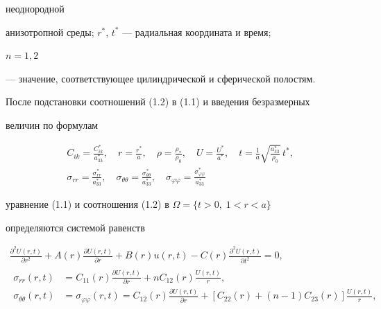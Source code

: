 неоднородной 


анизотропной среды; $r^*$, $t^*$ --- радиальная координата и время; 


$n=1,2$ 


--- значение, соответствующее цилиндрической и сферической полостям. 


 


После подстановки соотношений (1.2) в (1.1) и введения безразмерных 


величин по формулам 


\begin{gather*} 


C_{ik}=\frac{C^*_{ik}}{a^*_{33}},\quad r=\frac{r^*}{a},\quad 


\rho=\frac{\rho_*}{\rho_0},\quad U=\frac{U^*}{a^*},\quad 


t=\frac{1}{a}\sqrt{\frac{a^*_{33}}{\rho_0}}\,t^*, \\ 


\sigma_{rr}=\frac{\sigma^*_{rr}}{a^*_{33}},\quad 


\sigma_{\theta\theta}=\frac{\sigma^*_{\theta\theta}}{a^*_{33}},\quad 


\sigma_{\varphi\varphi}=\frac{\sigma^*_{\varphi\varphi}}{a^*_{33}} 


\end{gather*} 


уравнение (1.1) и соотношения (1.2) в $\Omega=\{t>0,\;1<r<a\}$ 


определяются системой равенств 


\begin{gather} 


\frac{\partial^2U(r,t)}{\partial r^2}+A(r) 


\frac{\partial U(r,t)}{\partial r}+B(r)u(r,t)-C(r) 


\frac{\partial^2U(r,t)}{\partial t^2}=0, \\ 


\begin{split} 


\sigma_{rr}(r,t)&=C_{11}(r)\frac{\partial U(r,t)}{\partial r}+ 


n C_{12}(r)\frac{U(r,t)}{r}, \\ 


\sigma_{\theta\theta}(r,t)&=\sigma_{\varphi\varphi}(r,t)= 


C_{12}(r)\frac{\partial U(r,t)}{\partial r}+ 


[C_{22}(r)+(n-1)C_{23}(r)]\frac{U(r,t)}{r}, 


\end{split} 


\end{gather} 



